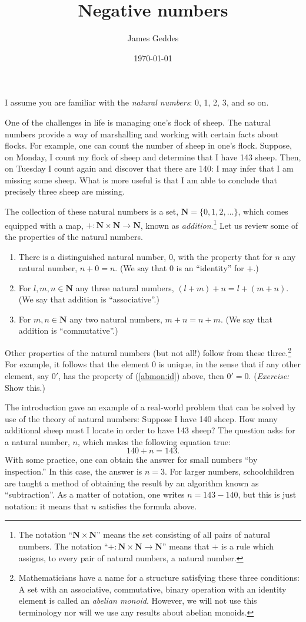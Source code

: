 \documentclass[10pt, a4paper, twocolumn]{article}
\author{James Geddes}
\date{\today}
\title{Negative numbers}
\newcommand{\set}[1]{\mathbold{#1}}
\newcommand{\N}{\set{N}}
\begin{document}
\maketitle

I assume you are familiar with the \emph{natural numbers}: 0, 1, 2, 3,
and so on.

One of the challenges in life is managing one's flock of sheep. The
natural numbers provide a way of marshalling and working with certain
facts about flocks. For example, one can count the number of sheep in
one's flock. Suppose, on Monday, I count my flock of sheep and
determine that I have 143 sheep. Then, on Tuesday I count again and
discover that there are 140: I may infer that I am missing some
sheep. What is more useful is that I am able to conclude that
precisely three sheep are missing.

The collection of these natural numbers is a set,
$\N=\{0,1,2,\dotsc\}$, which comes equipped with a map,
$+:\N\times\N\to\N$, known as \emph{addition}.\footnote{The notation
``$\N\times\N$'' means the set consisting of all pairs of natural
numbers. The notation ``$+:\N\times\N\to\N$'' means that $+$ is a rule
which assigns, to every pair of natural numbers, a natural number.}
Let us review some of the properties of the natural numbers.
\begin{enumerate}
\item There is a distinguished natural number, $0$, with the
  property that for $n$ any natural number, $n+0=n$. (We say that $0$
  is an ``identity'' for $+$.)\label{abmon:id}
\item For $l,m,n\in\N$ any three natural numbers, $(l+m)+n=l+(m+n)$. (We say
  that addition is ``associative''.)
\item For $m,n\in\N$ any two natural numbers, $m+n=n+m$. (We say that
  addition is ``commutative''.)
\end{enumerate}
Other properties of the natural numbers (but not all!) follow from
these three.\footnote{Mathematicians have a name for a structure
satisfying these three conditions: A set with an associative,
commutative, binary operation with an identity element is called an
\emph{abelian monoid}. However, we will not use this terminology nor
will we use any results about abelian monoids.} For example, it
follows that the element $0$ is unique, in the sense that if any other
element, say $0'$, has the property of (\ref{abmon:id}) above, then
$0'=0$. (\emph{Exercise:} Show this.)

The introduction gave an example of a real-world problem that can be
solved by use of the theory of natural numbers: Suppose I have 140
sheep. How many additional sheep must I locate in order to have 143
sheep? The question asks for a natural number, $n$, which makes the
following equation true:
\begin{equation*}
140 + n = 143.
\end{equation*}
With some practice, one can obtain the answer for small numbers ``by
inspection.'' In this case, the answer is $n=3$. For larger numbers,
schoolchildren are taught a method of obtaining the result by an
algorithm known as ``subtraction''. As a matter of notation, one
writes $n = 143 - 140$, but this is just notation: it means that $n$
satisfies the formula above.
\end{document}

